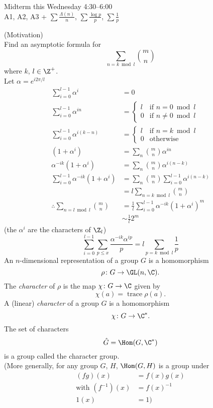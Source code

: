 Midterm this Wednesday 4:30--6:00 \\
A1, A2, A3 + $\sum\frac{\Lambda(n)}{n}$, $\sum\frac{\log p}{p}$, $\sum\frac1p$

\eg (Motivation) \\
Find an asymptotic formula for
\[ \sum_{n=k\bmod l}\binom{m}{n} \]
where $k$, $l\in\Z^+$. \\
\soln Let $\alpha=e^{i2\pi/l}$
\begin{align*}
\sum_{i=0}^{l-1}\alpha^i &= 0 \\
\sum_{i=0}^{l-1}\alpha^{in} &= \begin{cases}
l & \text{if $n=0\bmod l$} \\
0 & \text{if $n\neq0\bmod l$}
\end{cases} \\
\sum_{i=0}^{l-1}\alpha^{i(k-n)} &= \begin{cases}
l & \text{if $n=k\bmod l$} \\
0 & \text{otherwise}
\end{cases} \\
(1+\alpha^i) &= \sum_n \binom{m}{n}\alpha^{in} \\
\alpha^{-ik}(1+\alpha^i) &= \sum_n \binom{m}{n}\alpha^{i(n-k)} \\
\sum_{i=0}^{l-1}\alpha^{-ik}(1+\alpha^i) &= \sum_n \binom{m}{n} \sum_{i=0}^{l-1} \alpha^{i(n-k)} \\
&= l \sum_{n=k\bmod l}\binom{m}{n} \\
\therefore \sum_{n=l\bmod l}\binom{m}{n} &= \frac1l \sum_{i=0}^{l-1} \alpha^{-ik}(1+\alpha^i)^m \\
&\sim \frac1l 2^m
\end{align*}
(the $\alpha^i$ are the characters of $\Z_l$)
\[ \sum_{i=0}^{l-1}\sum_{p\leq x}\frac{\alpha^{-ik}\alpha^{ip}}{p} = l\sum_{p=k\bmod l}\frac1p \]
An $n$-dimensional representation of a group $G$ is a homomorphism
\[ \rho\colon G\to\GL(n,\C) . \]
The \emph{character} of $\rho$ is the map $\chi\colon G\to\C$ given by
\[ \chi(a) = \operatorname{trace} \rho(a) . \]
 A (linear) \emph{character} of a group $G$ is a homomorphism
\[ \chi\colon G \to \C^* . \]
The set of characters
\[ \hat G = \Hom(G,\C^*) \]
is a group called the character group. \\
(More generally, for any group $G$, $H$, $\Hom(G,H)$ is a group under
\begin{align*}
(fg)(x) &= f(x)g(x) \\
\text{with } (f^{-1})(x) &= f(x)^{-1} \\
1(x) &= 1 )
\end{align*}
